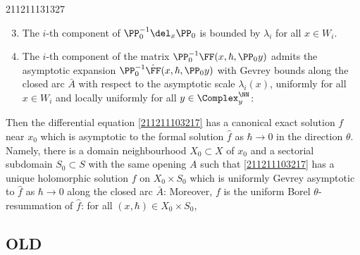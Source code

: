 \documentclass[11pt]{article}
\begin{document}
\begin{thm}{211211131327}
\begin{enumerate}
\setcounter{enumi}{2}
\item The $i$-th component of $\PP_0^{-1} \del_x \PP_0$ is bounded by $\lambda_i$ for all $x \in W_i$.
\item The $i$-th component of the matrix $\PP_0^{-1} \FF (x, \hbar, \PP_0 y)$ admits the asymptotic expansion $\PP_0^{-1} \hat{\FF} (x, \hbar, \PP_0 y)$ with Gevrey bounds along the closed arc $\bar{A}$ with respect to the asymptotic scale $\lambda_i (x)$, uniformly for all $x \in W_i$ and locally uniformly for all $y \in \Complex^\NN_y$:
\end{enumerate}

Then the differential equation \eqref{211211103217} has a canonical exact solution $f$ near $x_0$ which is asymptotic to the formal solution $\hat{f}$ as $\hbar \to 0$ in the direction $\theta$.
Namely, there is a domain neighbourhood $X_0 \subset X$ of $x_0$ and a sectorial subdomain $S_0 \subset S$ with the same opening $A$ such that \eqref{211211103217} has a unique holomorphic solution $f$ on $X_0 \times S_0$ which is uniformly Gevrey asymptotic to $\hat{f}$ as $\hbar \to 0$ along the closed arc $\bar{A}$:
Moreover, $f$ is the uniform Borel $\theta$-resummation of $\hat{f}$: for all $(x, \hbar) \in X_0 \times S_0$,
\end{thm}




















\newpage
\HRule












\subsection{OLD}
\end{document}
